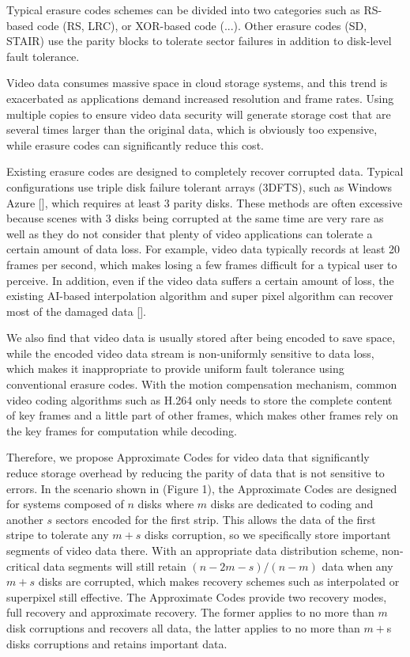 \documentclass[conference]{IEEEtran}
\begin{document}
Typical erasure codes schemes can be divided into two categories such as RS-based code (RS, LRC), or XOR-based code (...). Other erasure codes (SD, STAIR) use the parity blocks to tolerate sector failures in addition to disk-level fault tolerance.

Video data consumes massive space in cloud storage systems, and this trend is exacerbated as applications demand increased resolution and frame rates. Using multiple copies to ensure video data security will generate storage cost that are several times larger than the original data, which is obviously too expensive, while erasure codes can significantly reduce this cost.

Existing erasure codes are designed to completely recover corrupted data. Typical configurations use triple disk failure tolerant arrays (3DFTS), such as Windows Azure [], which requires at least 3 parity disks. These methods are often excessive because scenes with 3 disks being corrupted at the same time are very rare as well as they do not consider that plenty of video applications can tolerate a certain amount of data loss. For example, video data typically records at least 20 frames per second, which makes losing a few frames difficult for a typical user to perceive. In addition, even if the video data suffers a certain amount of loss, the existing AI-based interpolation algorithm and super pixel algorithm can recover most of the damaged data [].

We also find that video data is usually stored after being encoded to save space, while the encoded video data stream is non-uniformly sensitive to data loss, which makes it inappropriate to provide uniform fault tolerance using conventional erasure codes. With the motion compensation mechanism, common video coding algorithms such as H.264 only needs to store the complete content of key frames and a little part of other frames, which makes other frames rely on the key frames for computation while decoding.

Therefore, we propose Approximate Codes for video data that significantly reduce storage overhead by reducing the parity of data that is not sensitive to errors. In the scenario shown in (Figure 1), the Approximate Codes are designed for systems composed of $n$ disks where $m$ disks are dedicated to coding and another $s$ sectors encoded for the first strip. This allows the data of the first stripe to tolerate any $m+s$ disks corruption, so we specifically store important segments of video data there. With an appropriate data distribution scheme, non-critical data segments will still retain $(n-2m-s)/(n-m)$ data when any $m+s$ disks are corrupted, which makes
recovery schemes such as interpolated or superpixel still effective. The Approximate Codes provide two recovery modes, full recovery and approximate recovery. The former applies to no more than $m$ disk corruptions and recovers all data, the latter applies to no more than $m+$s disks corruptions and retains important data.
\end{document}
